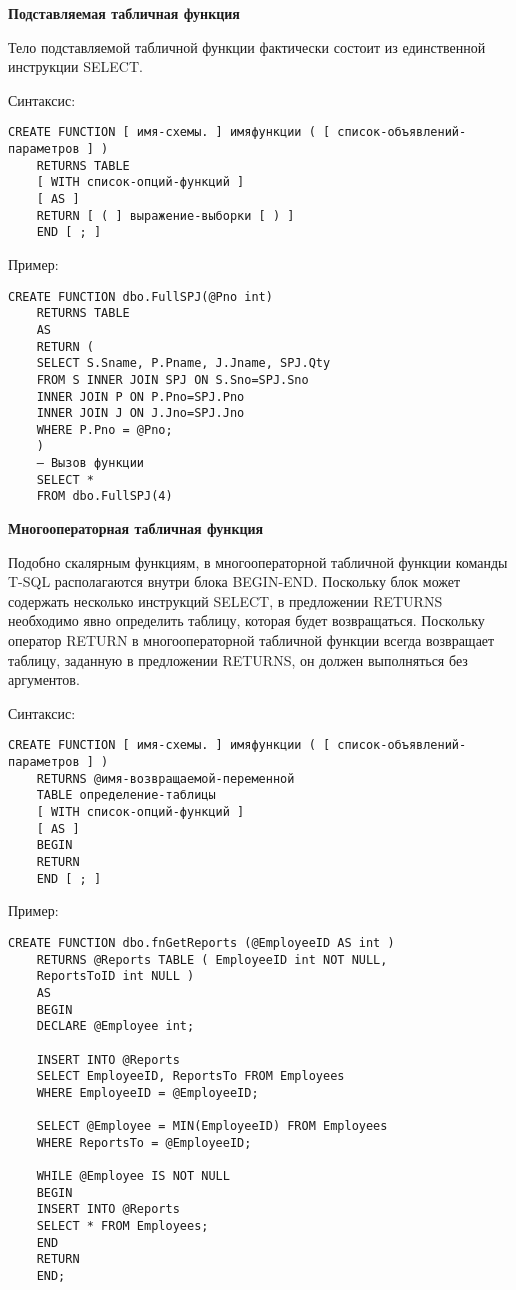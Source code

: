 \textbf{Подставляемая табличная функция}

Тело подставляемой табличной функции фактически состоит из единственной инструкции
SELECT.

Синтаксис:
\begin{lstlisting}[label=podstfuncsint]
	CREATE FUNCTION [ имя-схемы. ] имяфункции ( [ список-объявлений-параметров ] )
	RETURNS TABLE
	[ WITH список-опций-функций ]
	[ AS ]
	RETURN [ ( ] выражение-выборки [ ) ]
	END [ ; ] 
\end{lstlisting}
Пример:
\begin{lstlisting}[label=podstfuncexample]
	CREATE FUNCTION dbo.FullSPJ(@Pno int)
	RETURNS TABLE
	AS
	RETURN (
	SELECT S.Sname, P.Pname, J.Jname, SPJ.Qty
	FROM S INNER JOIN SPJ ON S.Sno=SPJ.Sno
	INNER JOIN P ON P.Pno=SPJ.Pno
	INNER JOIN J ON J.Jno=SPJ.Jno
	WHERE P.Pno = @Pno;
	)
	— Вызов функции
	SELECT *
	FROM dbo.FullSPJ(4)
\end{lstlisting}

\textbf{Многооператорная табличная функция}

Подобно скалярным функциям, в многооператорной табличной функции команды T-SQL
располагаются внутри блока BEGIN-END. Поскольку блок может содержать несколько
инструкций SELECT, в предложении RETURNS необходимо явно определить таблицу,
которая будет возвращаться. Поскольку оператор RETURN в многооператорной табличной
функции всегда возвращает таблицу, заданную в предложении RETURNS, он должен
выполняться без аргументов.

Синтаксис:
\begin{lstlisting}[label=mnogfuncsint]
	CREATE FUNCTION [ имя-схемы. ] имяфункции ( [ список-объявлений-параметров ] )
	RETURNS @имя-возвращаемой-переменной
	TABLE определение-таблицы
	[ WITH список-опций-функций ]
	[ AS ]
	BEGIN
	RETURN
	END [ ; ] 
\end{lstlisting}
Пример:
\begin{lstlisting}[label=mnogfuncexample]
	CREATE FUNCTION dbo.fnGetReports (@EmployeeID AS int )
	RETURNS @Reports TABLE ( EmployeeID int NOT NULL,
	ReportsToID int NULL )
	AS
	BEGIN
	DECLARE @Employee int;
	
	INSERT INTO @Reports
	SELECT EmployeeID, ReportsTo FROM Employees
	WHERE EmployeeID = @EmployeeID;
	
	SELECT @Employee = MIN(EmployeeID) FROM Employees
	WHERE ReportsTo = @EmployeeID;
	
	WHILE @Employee IS NOT NULL
	BEGIN
	INSERT INTO @Reports
	SELECT * FROM Employees;
	END
	RETURN
	END; 
\end{lstlisting}


